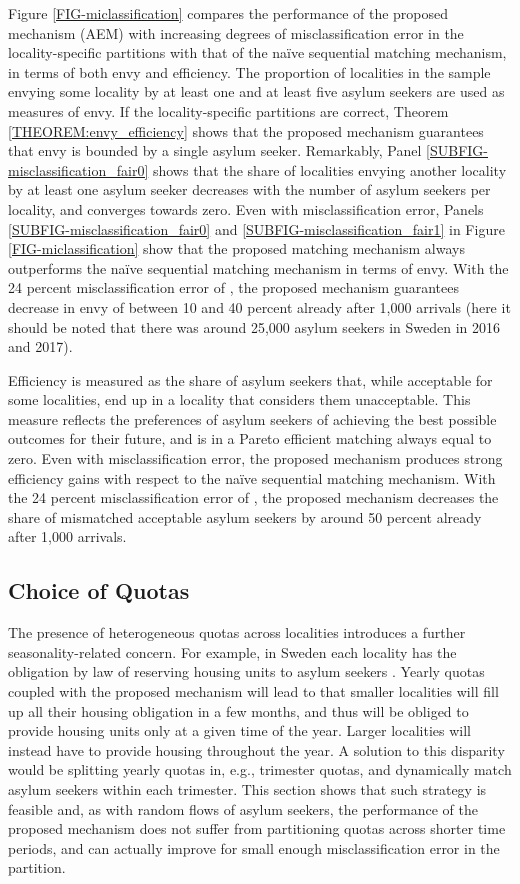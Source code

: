 \documentclass[12pt,fleqn]{article}
\begin{document}
Figure \ref{FIG-miclassification} compares the performance of the proposed mechanism (AEM) with increasing degrees of misclassification error in the locality-specific partitions with that of the na\"{i}ve sequential matching mechanism, in terms of both envy and efficiency. The proportion of localities in the sample envying some locality by at least one and at least five asylum seekers are used as measures of envy. If the locality-specific partitions are correct, Theorem \ref{THEOREM:envy_efficiency} shows that the proposed mechanism guarantees that envy is bounded by a single asylum seeker. Remarkably, Panel \ref{SUBFIG-misclassification_fair0} shows that the share of localities envying another locality by at least one asylum seeker decreases with the number of asylum seekers per locality, and converges towards zero. Even with misclassification error, Panels \ref{SUBFIG-misclassification_fair0} and \ref{SUBFIG-misclassification_fair1} in Figure \ref{FIG-miclassification} show that the proposed matching mechanism always outperforms the na\"{i}ve sequential matching mechanism in terms of envy. With the 24 percent misclassification error of \cite{bib:BansakEtAl}, the proposed mechanism guarantees decrease in envy of between 10 and 40 percent already after 1,000 arrivals (here it should be noted that there was around 25,000 asylum seekers in Sweden in 2016 and 2017).

Efficiency is measured as the share of asylum seekers that, while acceptable for some localities, end up in a locality that considers them unacceptable. This measure reflects the preferences of asylum seekers of achieving the best possible outcomes for their future, and is in a Pareto efficient matching always equal to zero. Even with misclassification error, the proposed mechanism produces strong efficiency gains with respect to the na\"{i}ve sequential matching mechanism. With the 24 percent misclassification error of \cite{bib:BansakEtAl}, the proposed mechanism decreases the share of mismatched acceptable asylum seekers by around 50 percent already after 1,000 arrivals.

\subsection{Choice of Quotas}\label{SEC:quotas}
The presence of heterogeneous quotas across localities introduces a further seasonality-related concern. For example, in Sweden each locality has the obligation by law of reserving housing units to asylum seekers \citep[Swedish Law,][]{SFS2016}. Yearly quotas coupled with the proposed mechanism will lead to that smaller localities will fill up all their housing obligation in a few months, and thus will be obliged to provide housing units only at a given time of the year. Larger localities will instead have to provide housing throughout the year. A solution to this disparity would be splitting yearly quotas in, e.g., trimester quotas, and dynamically match asylum seekers within each trimester. This section shows that such strategy is feasible and, as with random flows of asylum seekers, the performance of the proposed mechanism does not suffer from partitioning quotas across shorter time periods, and can actually improve for small enough misclassification error in the partition.
\end{document}
